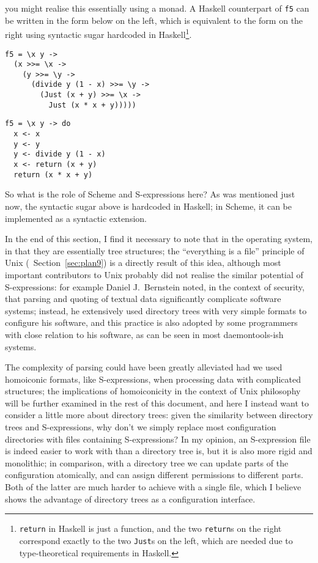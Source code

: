 you might realise this essentially using a monad.  A Haskell counterpart of
\verb|f5| can be written in the form below on the left, which is equivalent
to the form on the right using syntactic sugar hardcoded in Haskell\footnote%
{\texttt{return} in Haskell is just a function, and the two \texttt{return}s
on the right correspond exactly to the two \texttt{Just}s on the left,
which are needed due to type-theoretical requirements in Haskell.}.
\colskipa\begin{multicols}{2}
\begin{quoting}
\begin{Verbatim}
f5 = \x y ->
  (x >>= \x ->
    (y >>= \y ->
      (divide y (1 - x) >>= \y ->
        (Just (x + y) >>= \x ->
          Just (x * x + y)))))
\end{Verbatim}
\end{quoting}
\begin{quoting}
\begin{Verbatim}
f5 = \x y -> do
  x <- x
  y <- y
  y <- divide y (1 - x)
  x <- return (x + y)
  return (x * x + y)
\end{Verbatim}
\end{quoting}
\end{multicols}\colskipb\noindent%
So what is the role of Scheme and S-expressions here?  As was mentioned
just now, the syntactic sugar above is hardcoded in Haskell;
in Scheme, it can be implemented as a syntactic extension.

In the end of this section, I find it necessary to note that in the operating
system,  in that they are
essentially tree structures; the ``everything is a file'' principle of Unix
(\cf~Section~\ref{sec:plan9}) is a directly result of this idea, although
most important contributors to Unix probably did not realise the similar
potential of S-expressions: for example Daniel J.\ Bernstein noted, in the
context of security, that parsing and quoting of textual data significantly
complicate software systems; instead, he extensively
used directory trees with very simple formats to configure his software, and
this practice is also adopted by some programmers with close relation
to his software, as can be seen in most daemontools-ish systems.

The complexity of parsing could have been greatly alleviated had we used
homoiconic formats, like S-expressions, when processing data with complicated
structures; the implications of homoiconicity in the context of Unix philosophy
will be further examined in the rest of this document, and here I instead
want to consider a little more about directory trees: given the similarity
between directory trees and S-expressions, why don't we simply replace most
configuration directories with files containing S-expressions?  In my opinion,
an S-expression file is indeed easier to work with than a directory tree is,
but it is also more rigid and monolithic; in comparison, with a directory
tree we can update parts of the configuration atomically, and can assign
different permissions to different parts.  Both of the latter are much
harder to achieve with a single file, which I believe shows the
advantage of directory trees as a configuration interface.

